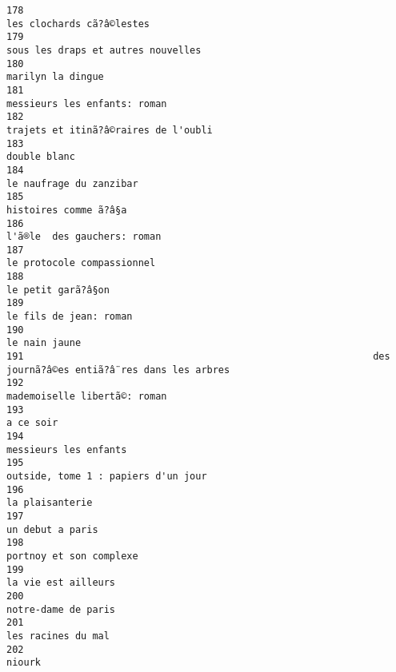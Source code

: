 \documentclass[
]{report}
\begin{document}
\begin{verbatim}
178                                                                               les clochards cã?â©lestes
179                                                                      sous les draps et autres nouvelles
180                                                                                       marilyn la dingue
181                                                                            messieurs les enfants: roman
182                                                                    trajets et itinã?â©raires de l'oubli
183                                                                                            double blanc
184                                                                                 le naufrage du zanzibar
185                                                                                   histoires comme ã?â§a
186                                                                             l'ã®le  des gauchers: roman
187                                                                              le protocole compassionnel
188                                                                                      le petit garã?â§on
189                                                                                  le fils de jean: roman
190                                                                                           le nain jaune
191                                                             des journã?â©es entiã?â¨res dans les arbres
192                                                                            mademoiselle libertã©: roman
193                                                                                               a ce soir
194                                                                                   messieurs les enfants
195                                                                     outside, tome 1 : papiers d'un jour
196                                                                                         la plaisanterie
197                                                                                        un debut a paris
198                                                                                 portnoy et son complexe
199                                                                                     la vie est ailleurs
200                                                                                     notre-dame de paris
201                                                                                      les racines du mal
202                                                                                                  niourk

\end{verbatim}
\end{document}
